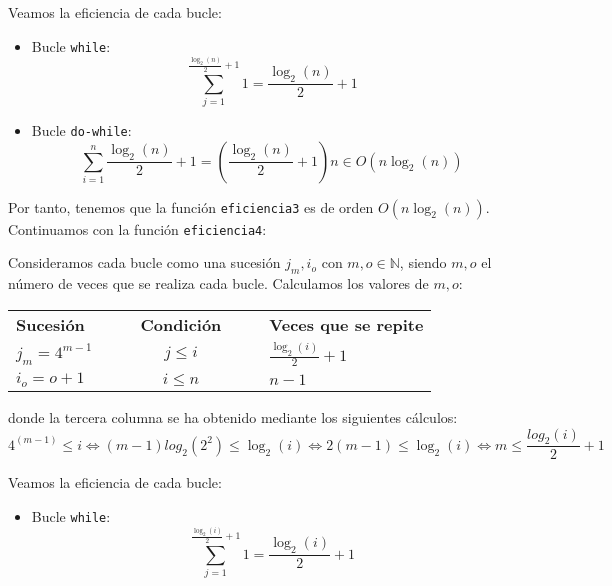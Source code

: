 \begin{ejercicio}
\begin{enumerate}[label=\alph*)]
            Veamos la eficiencia de cada bucle:
            \begin{itemize}
                \item Bucle \verb|while|:
                \begin{equation*}
                    \sum_{j=1}^{\frac{\log_2(n)}{2}+1} 1= \frac{\log_2(n)}{2}+1
                \end{equation*}

                \item Bucle \verb|do-while|:
                \begin{equation*}
                    \sum_{i=1}^{n} \frac{\log_2(n)}{2}+1 = \left(\frac{\log_2(n)}{2}+1\right)n \in O(n\log_2(n))
                \end{equation*}
            \end{itemize}
            
            Por tanto, tenemos que la función \verb|eficiencia3| es de orden $O(n\log_2(n))$.\\




            Continuamos con la función \verb|eficiencia4|:

            Consideramos cada bucle como una sucesión $j_m, i_o$ con $m,o\in \mathbb{N}$, siendo $m,o$ el número de veces que se realiza cada bucle. Calculamos los valores de $m,o$:
            \begin{center}
                \begin{tabular}{l l l c l l l}
                    \textbf{Sucesión}    &&&  \textbf{Condición} &&& \textbf{Veces que se repite}\\
                    $j_m = 4^{m-1}$            &&& $j\leq i$           &&& $\frac{\log_2(i)}{2}+1$\\
                    $i_o = o+1$    &&& $i\leq n$           &&& $n-1$\\
                \end{tabular}
            \end{center}
            donde la tercera columna se ha obtenido mediante los siguientes cálculos:
            \begin{equation*}
                4^{(m-1)} \leq i \Leftrightarrow (m-1) log_2 (2^2) \leq \log_2(i) \Leftrightarrow 2(m-1) \leq \log_2(i) \Leftrightarrow m\leq \frac{log_2(i)}{2} +1
            \end{equation*}
            
            Veamos la eficiencia de cada bucle:
            \begin{itemize}
                \item Bucle \verb|while|:
                \begin{equation*}
                    \sum_{j=1}^{\frac{\log_2(i)}{2}+1} 1= \frac{\log_2(i)}{2}+1
                \end{equation*}


\end{itemize}
\end{enumerate}
\end{ejercicio}
